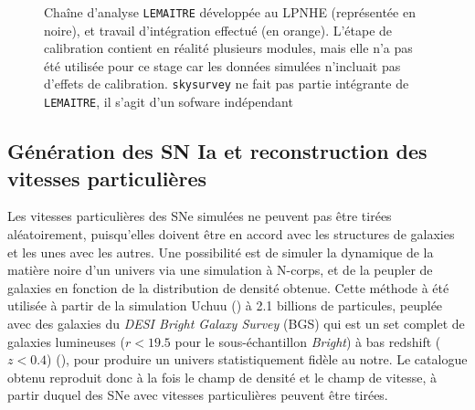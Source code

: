 \documentclass{book}
\def\lemaitre{\texttt{LEMAITRE}\xspace}
\def\saltd{\texttt{SALT2.4}\xspace}
\begin{document}
\begin{figure}
\caption{Chaîne d'analyse \lemaitre développée au LPNHE (représentée en noire), et travail d'intégration effectué (en orange). L'étape de calibration contient en réalité plusieurs modules, mais elle n'a pas été utilisée pour ce stage car les données simulées n'incluait pas d'effets de calibration. \texttt{skysurvey} ne fait pas partie intégrante de \lemaitre, il s'agit d'un sofware indépendant}
\label{fig:lemaitre_pipeline}
\end{figure}

\subsection{Génération des SN Ia et reconstruction des vitesses particulières}

Les vitesses particulières des SNe simulées ne peuvent pas être tirées aléatoirement, puisqu'elles doivent être en accord avec les structures de galaxies et les unes avec les autres. Une possibilité est de simuler la dynamique de la matière noire d'un univers via une simulation à N-corps, et de la peupler de galaxies en fonction de la distribution de densité obtenue. Cette méthode à été utilisée à partir de la simulation Uchuu (\cite{prada_desi_2023}) à 2.1 billions de particules, peuplée avec des galaxies du \textit{DESI Bright Galaxy Survey} (BGS) qui est un set complet de galaxies lumineuses ($r < 19.5$ pour le sous-échantillon \textit{Bright}) à bas redshift ($z<0.4$) (\cite{hahn_desi_2023}), pour produire un univers statistiquement fidèle au notre. Le catalogue obtenu reproduit donc à la fois le champ de densité et le champ de vitesse, à partir duquel des SNe avec vitesses particulières peuvent être tirées.
\end{document}
